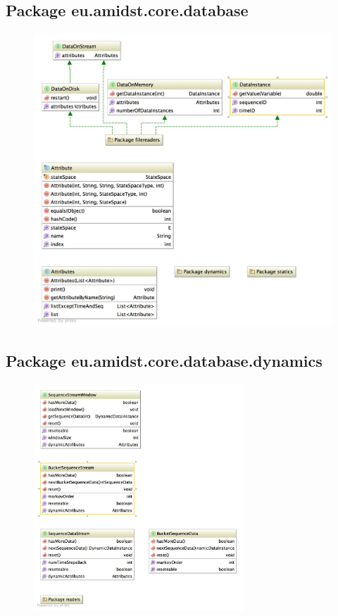 \subsection{Package eu.amidst.core.database}
\begin{figure}[H]
  \centering
    \includegraphics[width=\textwidth]{ClassDiagrams/core_database.jpg}
\end{figure}


\subsection{Package eu.amidst.core.database.dynamics}
\begin{figure}[H]
  \centering
    \includegraphics[width=0.7\textwidth]{ClassDiagrams/core_database_dynamics.jpg}
\end{figure}


